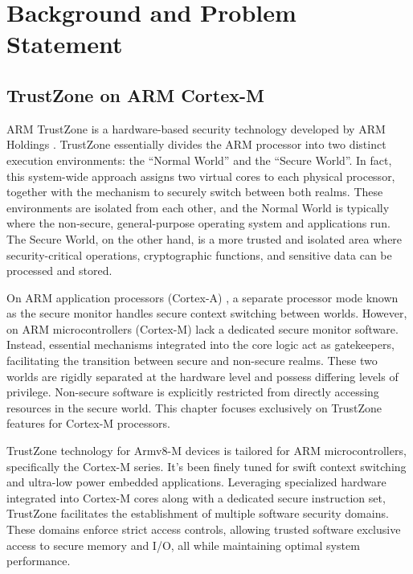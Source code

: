 \section{Background and Problem Statement } \label{sect:problem}

\subsection{TrustZone on ARM Cortex-M}

ARM TrustZone is a hardware-based security technology developed by ARM Holdings \cite{DemystifyingAT, TZArchitecture}. TrustZone essentially divides the ARM processor into two distinct execution environments: the ``Normal World'' and the ``Secure World''. In fact, this system-wide approach assigns two virtual cores to each physical processor, together with the mechanism to securely switch between both realms. These environments are isolated from each other, and the Normal World is typically where the non-secure, general-purpose operating system and applications run. The Secure World, on the other hand, is a more trusted and isolated area where security-critical operations, cryptographic functions, and sensitive data can be processed and stored.

On ARM application processors (Cortex-A) \cite{TZA}, a separate processor mode known as the secure monitor handles secure context switching between worlds. However, on ARM microcontrollers (Cortex-M) \cite{TZM} lack a dedicated secure monitor software. Instead, essential mechanisms integrated into the core logic act as gatekeepers, facilitating the transition between secure and non-secure realms. These two worlds are rigidly separated at the hardware level and possess differing levels of privilege. Non-secure software is explicitly restricted from directly accessing resources in the secure world. This chapter focuses exclusively on TrustZone features for Cortex-M processors.

TrustZone technology for Armv8-M devices is tailored for ARM microcontrollers, specifically the Cortex-M series. It's been finely tuned for swift context switching and ultra-low power embedded applications. Leveraging specialized hardware integrated into Cortex-M cores along with a dedicated secure instruction set, TrustZone facilitates the establishment of multiple software security domains. These domains enforce strict access controls, allowing trusted software exclusive access to secure memory and I/O, all while maintaining optimal system performance.

